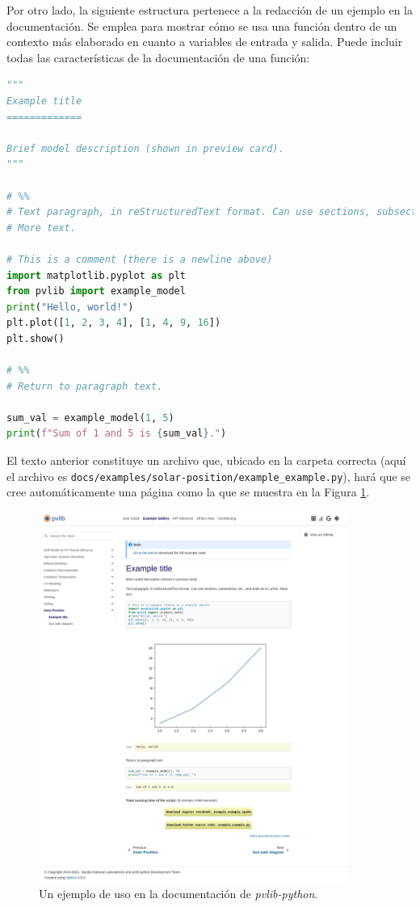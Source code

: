 Por otro lado, la siguiente estructura pertenece a la redacción de un ejemplo en la documentación. Se emplea para mostrar cómo se usa una función dentro de un contexto más elaborado en cuanto a variables de entrada y salida. Puede incluir todas las características de la documentación de una función:

\begin{lstlisting}[language=Python, caption={Plantilla para elaborar un ejemplo en \textit{pvlib-python}.}, label={lst:doc_example_example}]
"""
Example title
=============

Brief model description (shown in preview card).
"""

# %%
# Text paragraph, in reStructuredText format. Can use sections, subsections, etc., and math as in LaTeX.
# More text.

# This is a comment (there is a newline above)
import matplotlib.pyplot as plt
from pvlib import example_model
print("Hello, world!")
plt.plot([1, 2, 3, 4], [1, 4, 9, 16])
plt.show()

# %%
# Return to paragraph text.

sum_val = example_model(1, 5)
print(f"Sum of 1 and 5 is {sum_val}.")
\end{lstlisting}

El texto anterior constituye un archivo que, ubicado en la carpeta correcta (aquí el archivo es \texttt{docs/examples/solar-position/example\_example.py}), hará que se cree automáticamente una página como la que se muestra en la Figura \ref{fig:doc_use_example}.

\begin{figure}[H]
    \centering
    \includegraphics[width=0.9\textwidth]{./images/doc_example/example_stretch.png}
    \caption{Un ejemplo de uso en la documentación de \textit{pvlib-python}.}
    \label{fig:doc_use_example}
\end{figure}


